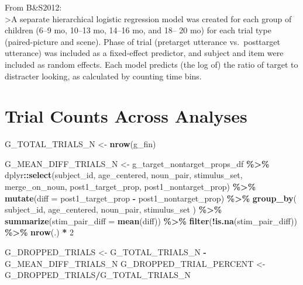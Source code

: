 \documentclass[
  doc,floatsintext]{apa6}
\newenvironment{Shaded}{\begin{snugshade}}{\end{snugshade}}
\newcommand{\AttributeTok}[1]{\textcolor[rgb]{0.13,0.29,0.53}{#1}}
\newcommand{\DecValTok}[1]{\textcolor[rgb]{0.00,0.00,0.81}{#1}}
\newcommand{\FunctionTok}[1]{\textcolor[rgb]{0.13,0.29,0.53}{\textbf{#1}}}
\newcommand{\NormalTok}[1]{#1}
\newcommand{\OtherTok}[1]{\textcolor[rgb]{0.56,0.35,0.01}{#1}}
\newcommand{\SpecialCharTok}[1]{\textcolor[rgb]{0.81,0.36,0.00}{\textbf{#1}}}
\begin{document}
From B\&S2012:\\
\textgreater A separate hierarchical logistic regression model was created
for each group of children (6--9 mo, 10--13 mo, 14--16 mo, and 18--
20 mo) for each trial type (paired-picture and scene). Phase of
trial (pretarget utterance vs.~posttarget utterance) was included
as a fixed-effect predictor, and subject and item were included
as random effects. Each model predicts (the log of) the ratio of
target to distracter looking, as calculated by counting time bins.

\section{Trial Counts Across Analyses}\label{trial-counts-across-analyses}

\begin{Shaded}
\begin{Highlighting}[]
\NormalTok{G\_TOTAL\_TRIALS\_N }\OtherTok{\textless{}{-}} \FunctionTok{nrow}\NormalTok{(g\_fin)}

\NormalTok{G\_MEAN\_DIFF\_TRIALS\_N }\OtherTok{\textless{}{-}}\NormalTok{ g\_target\_nontarget\_props\_df }\SpecialCharTok{\%\textgreater{}\%}
\NormalTok{  dplyr}\SpecialCharTok{::}\FunctionTok{select}\NormalTok{(subject\_id, age\_centered, }
\NormalTok{                noun\_pair, stimulus\_set, merge\_on\_noun, }
\NormalTok{                post1\_target\_prop,}
\NormalTok{                post1\_nontarget\_prop) }\SpecialCharTok{\%\textgreater{}\%}
  \FunctionTok{mutate}\NormalTok{(}\AttributeTok{diff =}\NormalTok{ post1\_target\_prop }\SpecialCharTok{{-}}\NormalTok{ post1\_nontarget\_prop) }\SpecialCharTok{\%\textgreater{}\%}
  \FunctionTok{group\_by}\NormalTok{(}
\NormalTok{    subject\_id, age\_centered, noun\_pair, stimulus\_set}
\NormalTok{  ) }\SpecialCharTok{\%\textgreater{}\%}
  \FunctionTok{summarize}\NormalTok{(}\AttributeTok{stim\_pair\_diff =} \FunctionTok{mean}\NormalTok{(diff)) }\SpecialCharTok{\%\textgreater{}\%}
  \FunctionTok{filter}\NormalTok{(}\SpecialCharTok{!}\FunctionTok{is.na}\NormalTok{(stim\_pair\_diff)) }\SpecialCharTok{\%\textgreater{}\%}
  \FunctionTok{nrow}\NormalTok{(.) }\SpecialCharTok{*} \DecValTok{2}

\NormalTok{G\_DROPPED\_TRIALS }\OtherTok{\textless{}{-}}\NormalTok{ G\_TOTAL\_TRIALS\_N }\SpecialCharTok{{-}}\NormalTok{ G\_MEAN\_DIFF\_TRIALS\_N }
\NormalTok{G\_DROPPED\_TRIAL\_PERCENT }\OtherTok{\textless{}{-}}\NormalTok{ G\_DROPPED\_TRIALS}\SpecialCharTok{/}\NormalTok{G\_TOTAL\_TRIALS\_N}
\end{Highlighting}
\end{Shaded}
\end{document}
